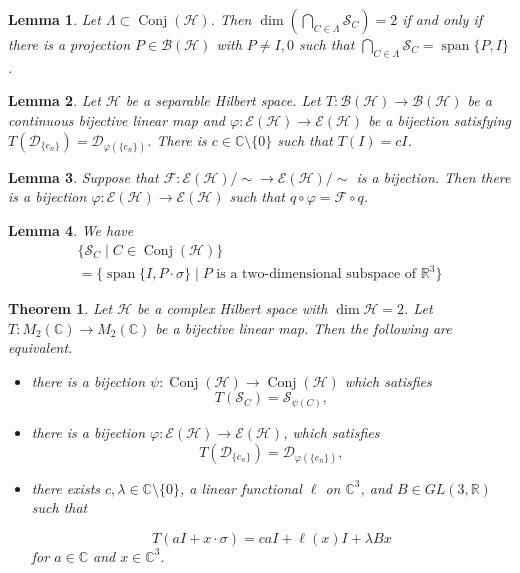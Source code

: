 \documentclass[10pt,a4paper]{amsart}
\newtheorem{theorem}{Theorem}
\newtheorem{lemma}{Lemma}
\newcommand{\BH}{\mathcal{B(H)}}
\newcommand{\Conj}{\operatorname{Conj}(\cH)}
\newcommand{\SC}{\mathcal{S}_C}
\newcommand{\Span}{\operatorname{span}}
\newcommand{\cH}{{\mathcal{H}}}
\begin{document}
\begin{lemma}\label{dim2t}
Let $\Lambda \subset \Conj$. Then  $\dim (\bigcap_{C \in \Lambda} \SC)=2$  if and only if 
there is a projection $P \in \BH$ with $P \neq I, 0$ such that %
$\bigcap_{C \in \Lambda} \SC=\Span \{P, I\}$.
\end{lemma}

\begin{lemma}\label{I3}
Let $\cH$ be a separable Hilbert space. Let $T: \BH \to \BH$ be a continuous bijective linear map  and  $\varphi: \mathcal{E}(\cH) \to \mathcal{E}(\cH)$ be a bijection satisfying $T(\mathcal{D}_{\{e_n\}}) = \mathcal{D}_{\varphi(\{e_n\})}$. There is $c \in \mathbb{C} \setminus \{0\} $ such that $T(I)=cI$.
\end{lemma}

\begin{lemma}\label{lift}
Suppose that $\mathcal{F}:\mathcal{E}(\cH)/ \sim \to \mathcal{E}(\cH)/ \sim$
is a bijection. Then there is a bijection $\varphi:\mathcal{E}(\cH) \to \mathcal{E}(\cH)$ such that $q\circ \varphi=\mathcal{F} \circ q$.
\end{lemma}

\begin{lemma}\label{plane}
We have
\begin{multline*}
    \{\SC \mid C \in \Conj\}\\=\{\Span\{I, P\cdot\sigma\} \mid P \text{ is  a two-dimensional subspace of $\mathbb{R}^3$}\}
\end{multline*}
\end{lemma}

\begin{theorem}\label{main0}
Let $\cH$ be a complex Hilbert space with $\dim \cH=2$.  Let $T: M_2(\mathbb{C}) \to M_2(\mathbb{C})$ be a bijective linear map. Then the following are equivalent.
\begin{itemize}
\item[(1)] there is a bijection $\psi: \Conj \to \Conj$ which satisfies  
 \[
T(\SC) = {\mathcal{S}_{\psi(C)}},
\]
\item[(2)] there is a bijection $\varphi: \mathcal{E}(\cH) \to \mathcal{E}(\cH)$,  which satisfies  
\[
T(\mathcal{D}_{\{e_n\}}) = \mathcal{D}_{\varphi(\{e_n\})},
\] 
\item[(3)] there exists $c, \lambda \in \mathbb{C} \setminus \{0\}$, a linear functional $\ell$ on $\mathbb{C}^3$, and $B \in GL(3,\mathbb{R})$ such that 

\[
T(aI+x\cdot \sigma)=c aI+\ell(x)I+\lambda Bx
\] 
for  $a \in \mathbb{C}$ and $x \in \mathbb{C}^3$.
\end{itemize}

\end{theorem}
\end{document}
